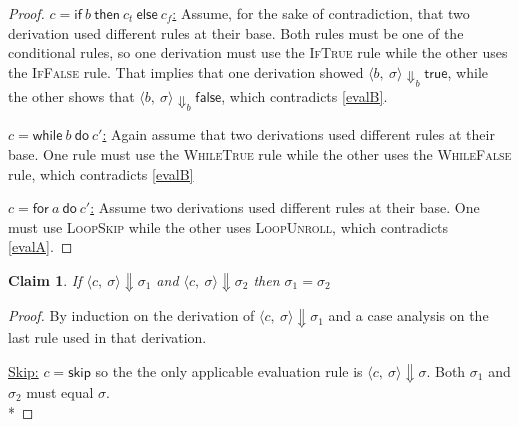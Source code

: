 \documentclass[10pt]{article}
\newcommand{\for}[2]{\textsf{for}~#1~\textsf{do}~#2}
\newcommand{\config}[2]{\langle#1,~#2\rangle}
\newcommand{\impSkip}{\textsf{skip}}
\newcommand{\impIf}[3]{\textsf{if}~#1~\textsf{then}~#2~\textsf{else}~#3}
\newcommand{\while}[2]{\textsf{while}~#1~\textsf{do}~#2}
\newcommand{\true}{\textsf{true}}
\newcommand{\false}{\textsf{false}}
\newcommand{\bigStepsB}{\Downarrow_b}
\newcommand{\bigSteps}{\Downarrow}
\newtheorem{claim}{Claim}[section]
\begin{document}
\begin{enumerate}[(a)]
\begin{proof}
    \underline{$c = \impIf{b}{c_t}{c_f}$:} Assume, for the sake of contradiction, that
    two derivation used different rules at their base. Both rules must be
    one of the conditional rules, so one derivation must use the
    \textsc{IfTrue} rule while the other uses the \textsc{IfFalse} rule.
    That implies that one derivation showed $\config{b}{\sigma} \bigStepsB
    \true$, while the other shows that $\config{b}{\sigma} \bigStepsB \false$,
    which contradicts \ref{evalB}.

    \underline{$c = \while{b}{c'}$:} Again assume that two derivations used
    different rules at their base. One rule must use the \textsc{WhileTrue}
    rule while the other uses the \textsc{WhileFalse} rule, which contradicts
    \ref{evalB}

    \underline{$c = \for{a}{c'}$:} Assume two derivations used different rules
    at their base. One must use \textsc{LoopSkip} while the other uses
    \textsc{LoopUnroll}, which contradicts \ref{evalA}.
  \end{proof}

  \begin{claim} \label{claimFour}
    If   $\config{c}{\sigma} \bigSteps \sigma_1$
    and  $\config{c}{\sigma} \bigSteps \sigma_2$
    then $\sigma_1 = \sigma_2$
  \end{claim}

  \begin{proof} By induction on the derivation of $\config{c}{\sigma} \bigSteps
    \sigma_1$ and a case analysis on the last rule used in that derivation.


    \underline{\sc Skip:} %
    $c = \impSkip$ so the the only applicable evaluation rule
    is $\config{c}{\sigma} \bigSteps \sigma$. Both $\sigma_1$ and $\sigma_2$
    must equal $\sigma$. \\*


\end{proof}
\end{enumerate}
\end{document}

